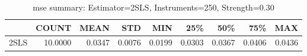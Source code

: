 \begin{table}[ht]
\centering
\caption{mse summary: Estimator=2SLS, Instruments=250, Strength=0.30}
\begin{tabular}{lrrrrrrrr}
\toprule
 & COUNT & MEAN & STD & MIN & 25\% & 50\% & 75\% & MAX \\
\midrule
2SLS & 10.0000 & 0.0347 & 0.0076 & 0.0199 & 0.0303 & 0.0367 & 0.0406 & 0.0436 \\
\bottomrule
\end{tabular}
\end{table}
